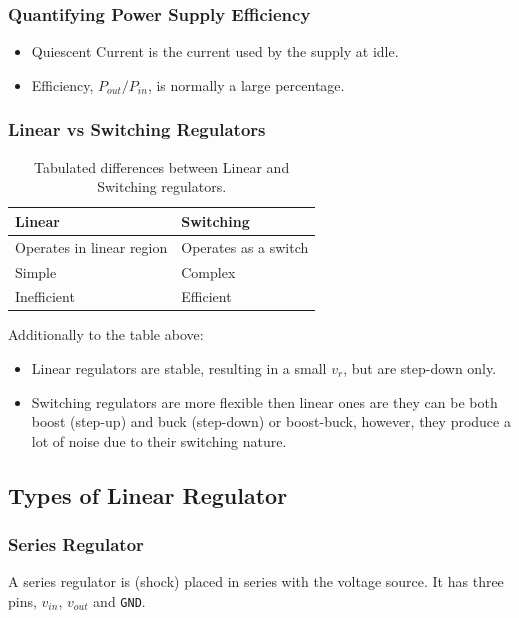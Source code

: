 \subsubsection{Quantifying Power Supply Efficiency}

\begin{itemize}
	\item Quiescent Current is the current used by the supply at idle.
	\item Efficiency, $P_{out} / P_{in}$, is normally a large percentage.
\end{itemize}

\subsubsection{Linear vs Switching Regulators}

\begin{table}[H]
	\centering
	\caption{Tabulated differences between Linear and Switching regulators.}
    \begin{tabular}{ll}
    Linear & Switching \\
    \hline
    Operates in linear region & Operates as a switch \\
    Simple & Complex \\
    Inefficient & Efficient
    \end{tabular}
\end{table}

Additionally to the table above:

\begin{itemize}
	\item Linear regulators are stable, resulting in a small $v_r$, but are step-down only.
	\item Switching regulators are more flexible then linear ones are they can be both boost (step-up) and buck (step-down) or boost-buck, however, they produce a lot of noise due to their switching nature.
\end{itemize}

\subsection{Types of Linear Regulator}

\subsubsection{Series Regulator}

A series regulator is (shock) placed in series with the voltage source. It has three pins, $v_{in}$, $v_{out}$ and \texttt{GND}.


